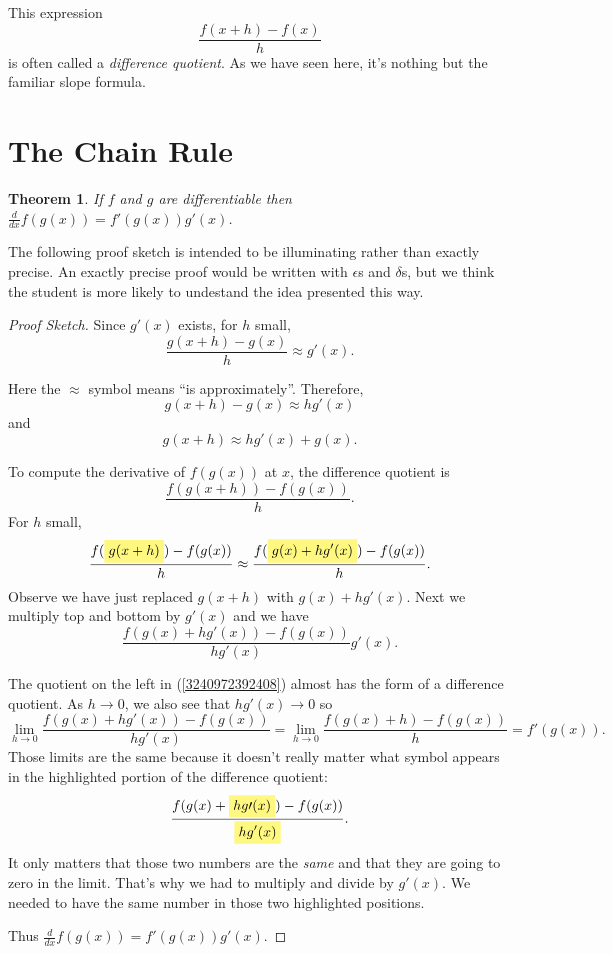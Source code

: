 \documentclass[11pt]{book}
\newcommand{\highlight}[1]{%
  \colorbox{yellow!50}{$\displaystyle#1$}}
\newtheorem{theorem}{Theorem}
\numberwithin{example}{chapter}
\begin{document}
This expression 
$$\frac{f(x+h)-f(x)}{h}$$
is often called a \emph{difference quotient}.  As we have seen here, it's nothing but the familiar slope formula.  



\section{The Chain Rule}


\begin{theorem}
If $f$ and $g$ are differentiable then $\frac{d}{dx}f(g(x)) = f'(g(x))g'(x)$.
\end{theorem}


The following proof sketch is intended to be illuminating rather than exactly precise.  An exactly precise proof would be written with $\epsilon$s and $\delta$s, but we think the student is more likely to undestand the idea presented this way.

\begin{proof}[Proof Sketch]

Since $g'(x)$ exists, for $h$ small, 
$$\frac{g(x+h)-g(x)}{h}\approx g'(x).$$

Here the $\approx$ symbol means ``is approximately''.  Therefore, 
$$g(x+h)-g(x)\approx hg'(x)$$
and 
$$g(x+h)\approx hg'(x)+g(x).$$

To compute the derivative of $f(g(x))$ at $x$, the difference quotient is $$\frac{f(g(x+h))-f(g(x))}{h}.$$
For $h$ small, 
$$ 
\frac{f(\highlight{g(x+h)})-f(g(x))}{h} \approx \frac{f(\highlight{g(x) + hg'(x)})-f(g(x))}{h}.$$
Observe we have just replaced $g(x+h)$ with $g(x) + hg'(x)$.  Next we multiply top and bottom by $g'(x)$ and we have 
\begin{equation} \label{3240972392408}
\frac{f(g(x) + hg'(x))-f(g(x))}{hg'(x)} g'(x).
\end{equation}

The quotient on the left in  (\ref{3240972392408}) almost has the form of a difference quotient.  As $h\to 0$, we also see that $hg'(x)\to 0$ so 
$$\lim_{h\to 0} \frac{f(g(x) + hg'(x))-f(g(x))}{hg'(x)}  = \lim_{h\to 0} \frac{f(g(x) + h)-f(g(x))}{h} = f'(g(x)).$$
Those limits are the same because it doesn't really matter what symbol appears in the highlighted portion of the difference quotient: 
$$\frac{f(g(x) + \highlight{hg\prime(x)})-f(g(x))}{\highlight{hg'(x)}}.$$
It only matters that those two numbers are the \emph{same} and that they are going to zero in the limit.  That's why we had to multiply and divide by $g'(x)$.  We needed to have the same number in those two highlighted positions.  

Thus $\frac{d}{dx}f(g(x)) = f'(g(x))g'(x)$.
\end{proof}
\end{document}
